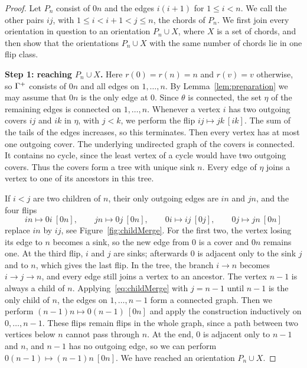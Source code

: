 \begin{proof}
Let $P_n$ consist of $0n$ and the edges $i(i+1)$ for $1\leq i<n$.
We call the other pairs $ij$, with $1\leq i<i+1<j\leq n$, the chords of $P_n$.
We first join every orientation in question to an orientation $P_n\cup X$, where
$X$ is a set of chords, and then show that the orientations $P_n\cup X$ with the
same number of chords lie in one flip class.

\smallskip\noindent\textbf{Step 1: reaching $P_n\cup X$.}
Here $r(0)=r(n)=n$ and $r(v)=v$ otherwise, so $\Gamma^{+}$ consists of $0n$ and all
edges on $1,\dotsc,n$.
By Lemma~\ref{lem:preparation} we may assume that $0n$ is the only edge at $0$.
Since $\theta$ is connected, the set $\eta$ of the remaining edges is connected on
$1,\dotsc,n$.
Whenever a vertex $i$ has two outgoing covers $ij$ and $ik$ in $\eta$, with $j<k$,
we perform the flip $ij\mapsto jk\ [ik]$.
The sum of the tails of the edges increases, so this terminates.
Then every vertex has at most one outgoing cover.
The underlying undirected graph of the covers is connected.
It contains no cycle, since the least vertex of a cycle would have two outgoing
covers.
Thus the covers form a tree with unique sink $n$.
Every edge of $\eta$ joins a vertex to one of its ancestors in this tree.

If $i<j$ are two children of $n$, their only outgoing edges are $in$ and $jn$,
and the four flips
\begin{equation}\label{eq:childMerge}
 in\mapsto0i\ [0n],\qquad jn\mapsto 0j\ [0n],\qquad
 0i\mapsto ij\ [0j],\qquad 0j\mapsto jn\ [0n]
\end{equation}
replace $in$ by $ij$, see Figure~\ref{fig:childMerge}.
For the first two, the vertex losing its edge to $n$ becomes a sink, so the new
edge from $0$ is a cover and $0n$ remains one.
At the third flip, $i$ and $j$ are sinks; afterwards $0$ is adjacent only to
the sink $j$ and to $n$, which gives the last flip.
In the tree, the branch $i\to n$ becomes $i\to j\to n$, and every edge still
joins a vertex to an ancestor.
The vertex $n-1$ is always a child of $n$.
Applying~\eqref{eq:childMerge} with $j=n-1$ until $n-1$ is the only child of
$n$, the edges on $1,\dotsc,n-1$ form a connected graph.
Then we perform $(n-1)n\mapsto 0(n-1)\ [0n]$ and apply the construction
inductively on $0,\dotsc,n-1$.
These flips remain flips in the whole graph, since a path between two vertices
below $n$ cannot pass through $n$.
At the end, $0$ is adjacent only to $n-1$ and $n$, and $n-1$ has no outgoing
edge, so we can perform $0(n-1)\mapsto(n-1)n\ [0n]$.
We have reached an orientation $P_n\cup X$.


\end{proof}
